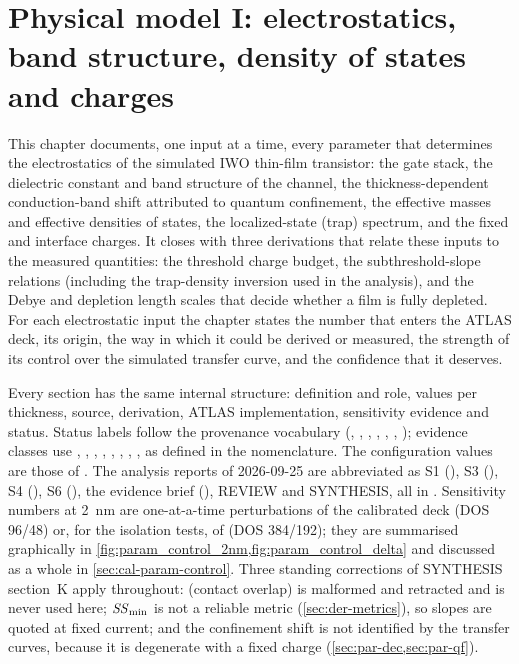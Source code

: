 \chapter{Physical model I: electrostatics, band structure, density of states and charges}
\label{ch:derivations-es}

This chapter documents, one input at a time, every parameter that determines the electrostatics of the
simulated IWO thin-film transistor: the gate stack, the dielectric constant and band structure of the
channel, the thickness-dependent conduction-band shift attributed to quantum confinement, the effective
masses and effective densities of states, the localized-state (trap) spectrum, and the fixed and
interface charges. It closes with three derivations that relate these inputs to the measured quantities:
the threshold charge budget, the subthreshold-slope relations (including the trap-density inversion
used in the analysis), and the Debye and depletion length scales that decide whether a film is fully depleted.
For each electrostatic input the chapter states the number that enters the ATLAS deck, its origin, the way in
which it could be derived or measured, the strength of its control over the simulated transfer curve, and the
confidence that it deserves.

Every section has the same internal structure: definition and role, values per thickness, source,
derivation, ATLAS implementation, sensitivity evidence and status. Status labels follow the provenance
vocabulary (, , ,
, , , ); evidence classes use
\evDATA, \evNUM, \evCAL, \evOOS, \evPOST, \evPRED, \evSURR, \evTHEORY, \evLIT{} as defined in the nomenclature.
The configuration values are those of . The analysis reports of
2026-09-25 are abbreviated as S1 (), S3
(), S4 (), S6
(), the evidence brief (), REVIEW and
SYNTHESIS, all in . Sensitivity numbers at 2~nm are one-at-a-time
perturbations of the calibrated deck  (DOS 96/48) or, for the isolation tests, of 
(DOS 384/192); they are summarised graphically in \cref{fig:param_control_2nm,fig:param_control_delta}
and discussed as a whole in \cref{sec:cal-param-control}. Three standing corrections of SYNTHESIS
section~K apply throughout:  (contact overlap) is malformed and retracted and is never used
here; $\mathit{SS}_{\min}$ is not a reliable metric (\cref{sec:der-metrics}), so slopes are quoted at fixed current; and the confinement shift
is not identified by the transfer curves, because it is degenerate with a fixed charge
(\cref{sec:par-dec,sec:par-qf}).

